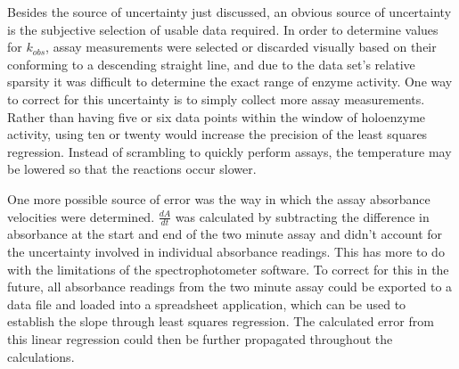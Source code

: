 Besides the source of uncertainty just discussed, an obvious source of uncertainty is the subjective selection of usable data required. In order to determine values for $k_{obs}$, assay measurements were selected or discarded visually based on their conforming to a descending straight line, and due to the data set's relative sparsity it was difficult to determine the exact range of enzyme activity. One way to correct for this uncertainty is to simply collect more assay measurements. Rather than having five or six data points within the window of holoenzyme activity, using ten or twenty would increase the precision of the least squares regression. Instead of scrambling to quickly perform assays, the temperature may be lowered so that the reactions occur slower. 

One more possible source of error was the way in which the assay absorbance velocities were determined. $\frac{dA}{dt}$ was calculated by subtracting the difference in absorbance at the start and end of the two minute assay and didn't account for the uncertainty involved in individual absorbance readings. This has more to do with the limitations of the spectrophotometer software. To correct for this in the future, all absorbance readings from the two minute assay could be exported to a data file and loaded into a spreadsheet application, which can be used to establish the slope through least squares regression. The calculated error from this linear regression could then be further propagated throughout the calculations. 